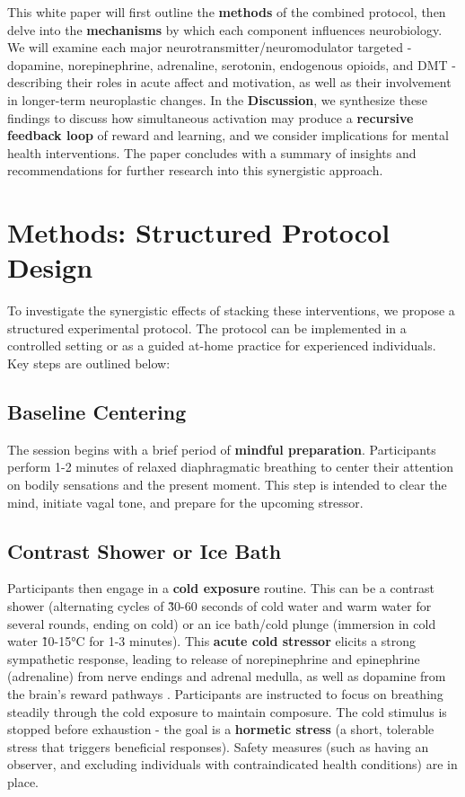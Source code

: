 \documentclass[11pt]{article}
\begin{document}
This white paper will first outline the \textbf{methods} of the combined protocol, then delve into the \textbf{mechanisms} by which each component influences neurobiology. We will examine each major neurotransmitter/neuromodulator targeted - dopamine, norepinephrine, adrenaline, serotonin, endogenous opioids, and DMT - describing their roles in acute affect and motivation, as well as their involvement in longer-term neuroplastic changes. In the \textbf{Discussion}, we synthesize these findings to discuss how simultaneous activation may produce a \textbf{recursive feedback loop} of reward and learning, and we consider implications for mental health interventions. The paper concludes with a summary of insights and recommendations for further research into this synergistic approach.



\section{Methods: Structured Protocol Design}
To investigate the synergistic effects of stacking these interventions, we propose a structured experimental protocol. The protocol can be implemented in a controlled setting or as a guided at-home practice for experienced individuals. Key steps are outlined below:

\subsection{Baseline Centering}
The session begins with a brief period of \textbf{mindful preparation}. Participants perform 1-2 minutes of relaxed diaphragmatic breathing to center their attention on bodily sensations and the present moment. This step is intended to clear the mind, initiate vagal tone, and prepare for the upcoming stressor.

\subsection{Contrast Shower or Ice Bath}
Participants then engage in a \textbf{cold exposure} routine. This can be a contrast shower (alternating cycles of \~30-60 seconds of cold water and warm water for several rounds, ending on cold) or an ice bath/cold plunge (immersion in cold water \~10-15°C for 1-3 minutes). This \textbf{acute cold stressor} elicits a strong sympathetic response, leading to release of norepinephrine and epinephrine (adrenaline) from nerve endings and adrenal medulla, as well as dopamine from the brain's reward pathways \cite{Brenner2001}. Participants are instructed to focus on breathing steadily through the cold exposure to maintain composure. The cold stimulus is stopped before exhaustion - the goal is a \textbf{hormetic stress} (a short, tolerable stress that triggers beneficial responses). Safety measures (such as having an observer, and excluding individuals with contraindicated health conditions) are in place.
\end{document}
